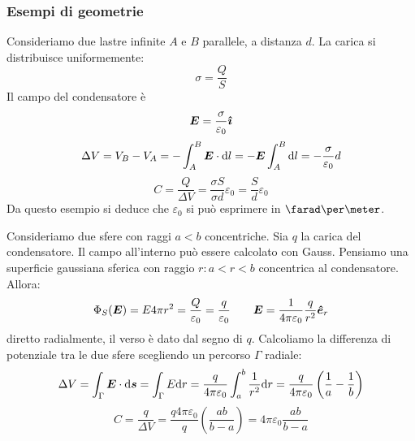 \subsubsection{Esempi di geometrie}
\begin{Es}[piano]
Consideriamo due lastre infinite $A$ e $B$ parallele, a distanza $d$. La carica si distribuisce uniformemente:
\begin{equation*}\sigma=\frac{Q}{S}\end{equation*}
Il campo del condensatore è 
\begin{equation*}\boldsymbol{E}=\frac{\sigma}{\varepsilon_0}\boldsymbol{\hat {\imath}}\end{equation*}
\begin{equation*}\Delta V=V_B-V_A=-\int_A^B\boldsymbol{E}\cdot\mathrm{d} l=-\boldsymbol{E}\int_A^B\mathrm{d} l=-\frac{\sigma}{\varepsilon_0}d\end{equation*}
\begin{equation*}C=\frac{Q}{\Delta V}=\frac{\sigma S}{\sigma d}\varepsilon_0=\frac{S}{d}\varepsilon_0\end{equation*}
Da questo esempio si deduce che $\varepsilon_0$ si può esprimere in $\farad\per\meter$.
\end{Es}
\begin{Es}[sferico]
Consideriamo due sfere con raggi $a<b$ concentriche. Sia $q$ la carica del condensatore. Il campo all'interno può essere calcolato con Gauss. Pensiamo una superficie gaussiana sferica con raggio $r:a<r<b$ concentrica al condensatore. Allora:
\begin{equation*}\Phi_S(\boldsymbol{E})=E 4\pi r^2=\frac{Q}{\varepsilon_0}=\frac{q}{\varepsilon_0}\qquad \boldsymbol{E}=\frac{1}{4\pi\varepsilon_0}\frac{q}{r^2}\boldsymbol{\hat {e}}_r\end{equation*}
diretto radialmente, il verso è dato dal segno di $q$. Calcoliamo la differenza di potenziale tra le due sfere scegliendo un percorso $\Gamma$ radiale:
\begin{equation*}\Delta V=\int_\Gamma\boldsymbol{E}\cdot\mathrm{d}\boldsymbol{s}=\int_\Gamma E\mathrm{d} r=\frac{q}{4\pi\varepsilon_0}\int_a^b\frac{1}{r^2}\mathrm{d} r=\frac{q}{4\pi\varepsilon_0}\left(\frac{1}{a}-\frac{1}{b}\right)\end{equation*}
\begin{equation*}C=\frac{q}{\Delta V}=\frac{q4\pi\varepsilon_0}{q}\left(\frac{ab}{b-a}\right)=4\pi\varepsilon_0\frac{ab}{b-a}\end{equation*}
\end{Es}
